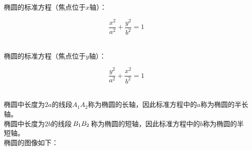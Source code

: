 \documentclass[UTF8]{ctexart}
\begin{document}
\newpage

    椭圆的标准方程（焦点位于$x$轴）：
    \begin{large}
        \begin{equation*}
            \frac{x^2}{a^2}+\frac{y^2}{b^2}=1
        \end{equation*}
    \end{large}\\
    椭圆的标准方程（焦点位于$y$轴）：
    \begin{large}
        \begin{equation*}
            \frac{y^2}{a^2}+\frac{x^2}{b^2}=1
        \end{equation*}
    \end{large}\\
    椭圆中长度为$2a$的线段$A_1A_2$称为椭圆的长轴，因此标准方程中的$a$称为椭圆的半长轴。\\[3mm]
    椭圆中长度为$2b$的线段$\hspace{1.75pt}B_1B_2\hspace{1.75pt}$称为椭圆的短轴，因此标准方程中的$b$称为椭圆的半短轴。\\[5mm]
    椭圆的图像如下：
\end{document}

